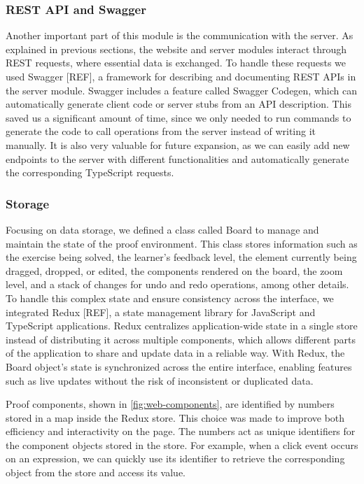 \subsubsection{REST API and Swagger}
Another important part of this module is the communication with the server. As explained in previous sections, the website and server modules interact through REST requests, where essential data is exchanged. To handle these requests we used Swagger [REF], a framework for describing and documenting REST APIs in the server module. Swagger includes a feature called Swagger Codegen, which can automatically generate client code or server stubs from an API description. This saved us a significant amount of time, since we only needed to run commands to generate the code to call operations from the server instead of writing it manually. It is also very valuable for future expansion, as we can easily add new endpoints to the server with different functionalities and automatically generate the corresponding TypeScript requests.

\subsubsection{Storage}
Focusing on data storage, we defined a class called Board to manage and maintain the state of the proof environment. This class stores information such as the exercise being solved, the learner's feedback level, the element currently being dragged, dropped, or edited, the components rendered on the board, the zoom level, and a stack of changes for undo and redo operations, among other details. To handle this complex state and ensure consistency across the interface, we integrated Redux [REF], a state management library for JavaScript and TypeScript applications. Redux centralizes application-wide state in a single store instead of distributing it across multiple components, which allows different parts of the application to share and update data in a reliable way. With Redux, the Board object’s state is synchronized across the entire interface, enabling features such as live updates without the risk of inconsistent or duplicated data.

Proof components, shown in \autoref{fig:web-components}, are identified by numbers stored in a map inside the Redux store. This choice was made to improve both efficiency and interactivity on the page. The numbers act as unique identifiers for the component objects stored in the store. For example, when a click event occurs on an expression, we can quickly use its identifier to retrieve the corresponding object from the store and access its value.

